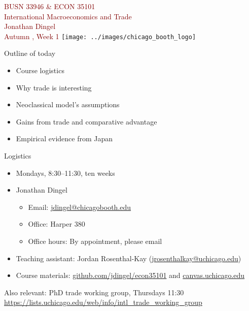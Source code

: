 \documentclass[10pt,notes=hide]{beamer}
\begin{document}
\begin{frame}[plain]
\begin{center}
\large
\textcolor{maroon}{BUSN 33946 \& ECON 35101\\
International Macroeconomics and Trade\\ 
Jonathan Dingel\\
Autumn \the\year, Week 1}
\vfill 
\texttt{[image: ../images/chicago\_booth\_logo]}
\end{center}
\end{frame}
\begin{frame}{Outline of today}
\begin{itemize}
	\item Course logistics
	\item Why trade is interesting
	\item Neoclassical model's assumptions
	\item Gains from trade and comparative advantage
	\item Empirical evidence from Japan
\end{itemize}
\end{frame}
\begin{frame}{Logistics}
\begin{itemize}
\item Mondays, 8:30--11:30, ten weeks
\item Jonathan Dingel
\begin{itemize}
	\item Email: \href{mailto:jdingel@chicagobooth.edu}{jdingel@chicagobooth.edu}
	\item Office: Harper 380 
	\item Office hours: By appointment, please email
\end{itemize}
\item Teaching assistant: Jordan Rosenthal-Kay (\href{mailto:jrosenthalkay@uchicago.edu}{jrosenthalkay@uchicago.edu}) 
\item Course materials: \href{http://github.com/jdingel/econ35101}{github.com/jdingel/econ35101} and \href{https://canvas.uchicago.edu/courses/22781}{canvas.uchicago.edu}
\end{itemize}
\vspace{5mm}
Also relevant: PhD trade working group, Thursdays 11:30 \\
{\footnotesize \url{https://lists.uchicago.edu/web/info/intl_trade_working_group}}
\end{frame}
\end{document}
